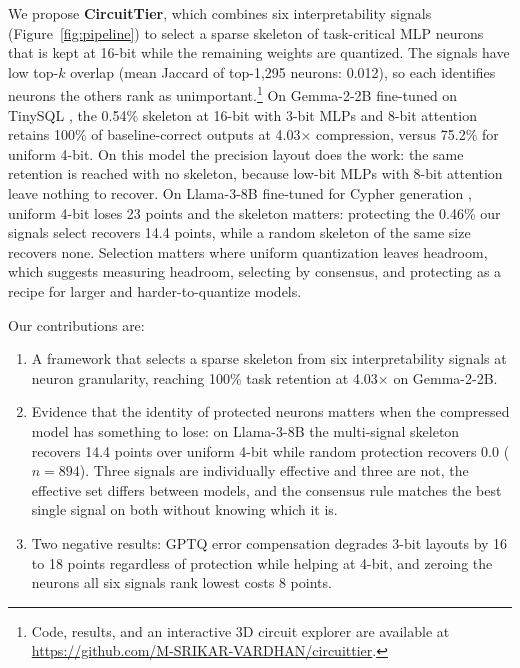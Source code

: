 \documentclass[11pt]{article}
\begin{document}
We propose \textbf{CircuitTier}, which combines six 
interpretability signals (Figure~\ref{fig:pipeline}) to select 
a sparse skeleton of task-critical MLP neurons that is kept at 
16-bit while the remaining weights are quantized. The signals 
have low top-$k$ overlap (mean Jaccard of top-1,295 neurons: 
0.012), so each identifies neurons the others rank as 
unimportant.\footnote{Code, results, and an interactive 3D 
circuit explorer are available at \url{https://github.com/M-SRIKAR-VARDHAN/circuittier}.} On 
Gemma-2-2B \cite{gemmateam2024gemma2improvingopen} fine-tuned on 
TinySQL \cite{harrasse2025tinysqlprogressivetexttosqldataset}, 
the 0.54\% skeleton at 16-bit with 3-bit MLPs and 8-bit 
attention retains 100\% of baseline-correct outputs at 
4.03$\times$ compression, versus 75.2\% for uniform 4-bit. On 
this model the precision layout does the work: the same 
retention is reached with no skeleton, because low-bit MLPs 
with 8-bit attention leave nothing to recover. On Llama-3-8B 
\cite{grattafiori2024llama3herdmodels} fine-tuned for Cypher 
generation \cite{ozsoy2024text2cypherbridgingnaturallanguage}, 
uniform 4-bit loses 23 points and the skeleton matters: 
protecting the 0.46\% our signals select recovers 14.4 points, 
while a random skeleton of the same size recovers none. 
Selection matters where uniform quantization leaves headroom, 
which suggests measuring headroom, selecting by consensus, and 
protecting as a recipe for larger and harder-to-quantize models.

Our contributions are:
\begin{enumerate}
\itemsep0em
\item A framework that selects a sparse skeleton from six 
interpretability signals at neuron granularity, reaching 100\% 
task retention at 4.03$\times$ on Gemma-2-2B.
\item Evidence that the identity of protected neurons matters 
when the compressed model has something to lose: on Llama-3-8B 
the multi-signal skeleton recovers 14.4 points over uniform 
4-bit while random protection recovers 0.0 ($n{=}894$). Three 
signals are individually effective and three are not, the 
effective set differs between models, and the consensus rule 
matches the best single signal on both without knowing which it 
is.
\item Two negative results: GPTQ error compensation degrades 
3-bit layouts by 16 to 18 points regardless of protection while 
helping at 4-bit, and zeroing the neurons all six signals rank 
lowest costs 8 points.
\end{enumerate}
\end{document}
